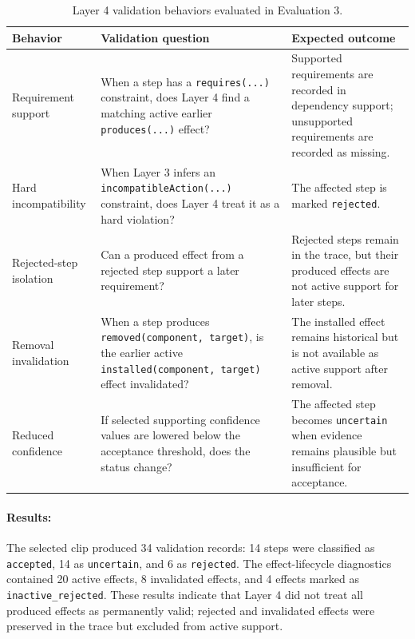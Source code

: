 \begin{table}[htbp]
\centering
\caption{Layer 4 validation behaviors evaluated in Evaluation 3.}
\label{tab:evaluation-validation-scenarios}
\begin{tabular}{p{} p{} p{}}
\toprule
Behavior & Validation question & Expected outcome \\
\midrule
Requirement support &
When a step has a \texttt{requires(...)} constraint, does Layer 4 find a matching active earlier \texttt{produces(...)} effect? &
Supported requirements are recorded in dependency support; unsupported requirements are recorded as missing. \\

Hard incompatibility &
When Layer 3 infers an \texttt{incompatibleAction(...)} constraint, does Layer 4 treat it as a hard violation? &
The affected step is marked \texttt{rejected}. \\

Rejected-step isolation &
Can a produced effect from a rejected step support a later requirement? &
Rejected steps remain in the trace, but their produced effects are not active support for later steps. \\

Removal invalidation &
When a step produces \texttt{removed(component, target)}, is the earlier active \texttt{installed(component, target)} effect invalidated? &
The installed effect remains historical but is not available as active support after removal. \\

Reduced confidence &
If selected supporting confidence values are lowered below the acceptance threshold, does the status change? &
The affected step becomes \texttt{uncertain} when evidence remains plausible but insufficient for acceptance. \\
\bottomrule
\end{tabular}
\end{table}


\paragraph{Results:}
The selected clip produced 34 validation records: 14 steps were classified as
\texttt{accepted}, 14 as \texttt{uncertain}, and 6 as \texttt{rejected}. The
effect-lifecycle diagnostics contained 20 active effects, 8 invalidated effects,
and 4 effects marked as \texttt{inactive\_rejected}. These results indicate that
Layer 4 did not treat all produced effects as permanently valid; rejected and
invalidated effects were preserved in the trace but excluded from active support.

